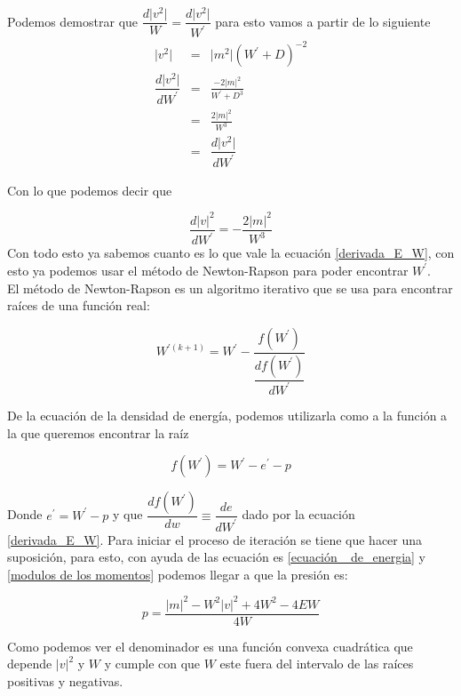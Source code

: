 \documentclass[12pt,a4paper]{book}
\providecommand{\abs}[1]{\lvert#1\rvert} %
\begin{document}
Podemos demostrar que $\dfrac{d \abs{v^2}}{W}=\dfrac{d \abs{v^2}}{W^{'}}$ para esto vamos a partir de lo siguiente 
\begin{eqnarray*}
\abs{v^2}&=& \abs{m^{2}} \left(W^{'} + D \right)^{-2} \\
\dfrac{d \abs{v^2}}{d W^{'}} &=& \frac{-2 \abs{m}^2}{W^{'}+D^{3}} \\
&=& \frac{2 \abs{m}^2}{W^{3}} \\
&=& \dfrac{d \abs{v^2}}{d W^{'}}
\end{eqnarray*}

Con lo que podemos decir que 

\begin{equation}\label{der_v2}
\dfrac{d\abs{v}^2}{d W^{'} }=-\frac{2 \abs{m}^{2}}{W^{3}}
\end{equation}
Con todo esto ya sabemos cuanto es lo que vale la ecuación \ref{derivada_E_W}, con esto ya podemos usar el método de Newton-Rapson para poder encontrar $W^{'}$.\\

El método de Newton-Rapson es un algoritmo iterativo que se usa para encontrar raíces  de una función real:

\begin{equation} \label{eq_Newton_Rapson}
W^{'(k+1)}=W^{'}-\frac{f(W^{'})}{\dfrac{d f(W^{'})}{d W^{'}}}
\end{equation}

De la ecuación de la densidad de energía, podemos utilizarla como a la función a la que queremos encontrar la raíz

\begin{equation} \label{ecuación_f}
f(W^{'})=W^{'}-e^{'}-p
\end{equation}

Donde $e^{'}=W^{'}-p$ y que $\dfrac{d f(W^{'})}{d w} \equiv \dfrac{de}{dW^{'}}$ dado por la ecuación \ref{derivada_E_W}. 
Para iniciar el proceso de iteración se tiene que hacer una suposición, para esto, con ayuda de las ecuación  es \ref{ecuación  _de_energia} 
y \ref{modulos de los momentos} podemos llegar a que la presión es:

\begin{equation} \label{presion_de_newton}
p=\frac{\abs{m}^{2}-W^{2}\abs{v}^{2}+4W^{2}-4EW}{4W}
\end{equation}

Como podemos ver el denominador es una función convexa cuadrática que depende $\abs{v}^{2}$ y $W$ y cumple con que $W$ este fuera del intervalo de las raíces positivas y negativas.
\end{document}

